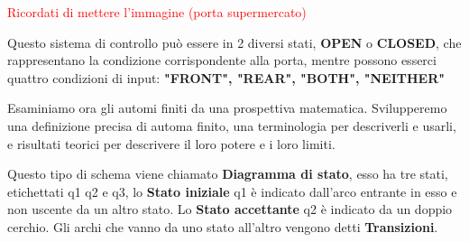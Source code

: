 \documentclass{article}
\begin{document}
\begin{center}
    \textcolor{red}{Ricordati di mettere l'immagine (porta supermercato)}
\end{center}

Questo sistema di controllo può essere in 2 diversi stati, \textbf{OPEN} o \textbf{CLOSED}, che rappresentano la condizione corrispondente alla porta, mentre possono esserci quattro condizioni di input: \textbf{"FRONT", "REAR", "BOTH", "NEITHER"}

\begin{center}    
\end{center} 

Esaminiamo ora gli automi finiti da una prospettiva matematica. Svilupperemo una definizione precisa di automa finito, una terminologia per descriverli e usarli, e risultati teorici per descrivere il loro potere e i loro limiti.

\begin{center}
\end{center}

Questo tipo di schema viene chiamato \textbf{Diagramma di stato}, esso ha tre stati, etichettati q1 q2 e q3, lo \textbf{Stato iniziale} q1 è indicato dall'arco entrante in esso e non uscente da un altro stato. Lo \textbf{Stato accettante} q2 è indicato da un doppio cerchio. Gli archi che vanno da uno stato all'altro vengono detti \textbf{Transizioni}.
\end{document}
